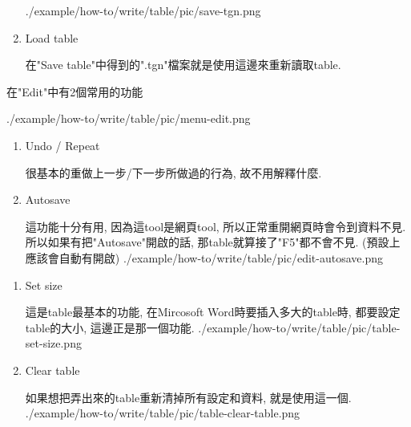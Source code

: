 \begin{enumerate}
{    \InsertFigure
      {./example/how-to/write/table/pic/save-tgn.png}

  } %

  \item
  {
    Load table

    在"Save table"中得到的".tgn"檔案就是使用這邊來重新讀取table.
  } %
  \end{enumerate}

\newpage
{}

  在"Edit"中有2個常用的功能

  \InsertFigure
    {./example/how-to/write/table/pic/menu-edit.png}

  \begin{enumerate}

  \item
  {
    Undo / Repeat

    很基本的重做上一步/下一步所做過的行為, 故不用解釋什麼.
  } %

  \item
  {
    Autosave

    這功能十分有用, 因為這tool是網頁tool, 所以正常重開網頁時會令到資料不見. 所以如果有把"Autosave"開啟的話, 那table就算接了"F5"都不會不見. (預設上應該會自動有開啟)
    \InsertFigure
      {./example/how-to/write/table/pic/edit-autosave.png}
  } %

  \end{enumerate}

\newpage
{}

  \begin{enumerate}

  \item
  {
    Set size

    這是table最基本的功能, 在Mircosoft Word時要插入多大的table時, 都要設定table的大小, 這邊正是那一個功能.
    \InsertFigure
      {./example/how-to/write/table/pic/table-set-size.png}
  } %

  \item
  {
    Clear table

    如果想把弄出來的table重新清掉所有設定和資料, 就是使用這一個.
    \InsertFigure
      {./example/how-to/write/table/pic/table-clear-table.png}
  } %

  \end{enumerate}

